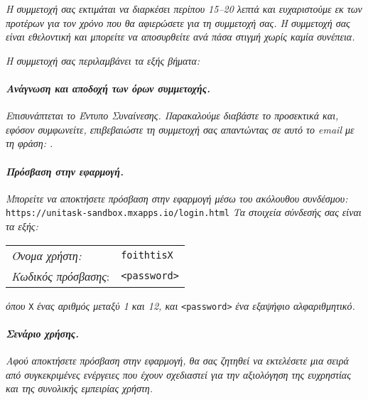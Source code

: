             \textit{Η συμμετοχή σας εκτιμάται να διαρκέσει περίπου 15--20 λεπτά και ευχαριστούμε εκ των προτέρων για τον χρόνο που θα αφιερώσετε για τη συμμετοχή σας. Η συμμετοχή σας είναι εθελοντική και μπορείτε να αποσυρθείτε ανά πάσα στιγμή χωρίς καμία συνέπεια.}

            \textit{Η συμμετοχή σας περιλαμβάνει τα εξής βήματα:}

            \paragraph{\textit{Ανάγνωση και αποδοχή των όρων συμμετοχής.}}
                \textit{Επισυνάπτεται το Έντυπο Συναίνεσης. Παρακαλούμε διαβάστε το προσεκτικά και, εφόσον συμφωνείτε, επιβεβαιώστε τη συμμετοχή σας απαντώντας σε αυτό το email με τη φράση: .}

            \paragraph{\textit{Πρόσβαση στην εφαρμογή.}}
                \textit{Μπορείτε να αποκτήσετε πρόσβαση στην εφαρμογή μέσω του ακόλουθου συνδέσμου:} \texttt{https://unitask-sandbox.mxapps.io/login.html} \textit{Τα στοιχεία σύνδεσής σας είναι τα εξής:}

            \begin{table}[H] \noindent
                \begin{tabular}{ll}
                    \textit{Όνομα χρήστη:} & \texttt{foithtisX} \\
                    \textit{Κωδικός πρόσβασης}: & \texttt{<password>}
                \end{tabular}
            \end{table}

            \noindent \textit{όπου} \texttt{X} \textit{ένας αριθμός μεταξύ 1 και 12, και} \texttt{<password>} \textit{ένα εξαψήφιο αλφαριθμητικό.}

            \paragraph{\textit{Σενάριο χρήσης.}}
                \textit{Αφού αποκτήσετε πρόσβαση στην εφαρμογή, θα σας ζητηθεί να εκτελέσετε μια σειρά από συγκεκριμένες ενέργειες που έχουν σχεδιαστεί για την αξιολόγηση της ευχρηστίας και της συνολικής εμπειρίας χρήστη.}

